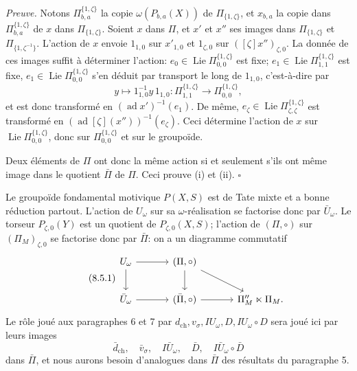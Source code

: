 \documentclass[10pt,a4paper]{article}
\newcommand{\Lie}{\operatorname{Lie}}
\newcommand{\ad}{\operatorname{ad}}
\theoremstyle{deligne}
\newenvironment{proofdel}{\textit{Preuve.}}{\hfill$\square$}
\newcommand{\heading}[1]{\vspace{0.65em}\noindent{\bfseries #1}\quad}
\begin{document}
\begin{proofdel}
Notons \(\Pi^{\{1,\zeta\}}_{b,a}\) la copie \(\omega(P_{b,a}(X))\) de \(\Pi_{\{1,\zeta\}}\), et \(x_{b,a}\) la copie dans \(\Pi^{\{1,\zeta\}}_{b,a}\) de \(x\) dans \(\Pi_{\{1,\zeta\}}\). Soient \(x\) dans \(\Pi\), et \(x'\) et \(x''\) ses images dans \(\Pi_{\{1,\zeta\}}\) et \(\Pi_{\{1,\zeta^{-1}\}}\). L'action de \(x\) envoie \(1_{1,0}\) sur \(x'_{1,0}\) et \(1_{\zeta,0}\) sur \(([\zeta]x'')_{\zeta,0}\). La donnée de ces images suffit à déterminer l'action: \(e_0\in\Lie\Pi^{\{1,\zeta\}}_{0,0}\) est fixe; \(e_1\in\Lie\Pi^{\{1,\zeta\}}_{1,1}\) est fixe, \(e_1\in\Lie\Pi^{\{1,\zeta\}}_{0,0}\) s'en déduit par transport le long de \(1_{1,0}\), c'est-à-dire par
\[
y\longmapsto 1_{1,0}^{-1}y\,1_{1,0}:\Pi^{\{1,\zeta\}}_{1,1}\longrightarrow\Pi^{\{1,\zeta\}}_{0,0},
\]
et est donc transformé en \((\ad x')^{-1}(e_1)\). De même, \(e_\zeta\in\Lie\Pi^{\{1,\zeta\}}_{\zeta,\zeta}\) est transformé en \((\ad[\zeta](x''))^{-1}(e_\zeta)\). Ceci détermine l'action de \(x\) sur \(\Lie\Pi^{\{1,\zeta\}}_{0,0}\), donc sur \(\Pi^{\{1,\zeta\}}_{0,0}\) et sur le groupoïde.

Deux éléments de \(\Pi\) ont donc la même action si et seulement s'ils ont même image dans le quotient \(\bar\Pi\) de \(\Pi\). Ceci prouve (i) et (ii).
\end{proofdel}

\heading{8.5.} Le groupoïde fondamental motivique \(P(X,S)\) est de Tate mixte et a bonne réduction partout. L'action de \(U_\omega\) sur sa \(\omega\)-réalisation se factorise donc par \(\bar U_\omega\). Le torseur \(P_{\zeta,0}(Y)\) est un quotient de \(P_{\zeta,0}(X,S)\); l'action de \((\Pi,\circ)\) sur \((\Pi_M)_{\zeta,0}\) se factorise donc par \(\bar\Pi\): on a un diagramme commutatif
\[
\tag{8.5.1}
\begin{tikzcd}[column sep=3.4em,row sep=2.1em]
U_\omega \arrow[r] \arrow[d] & (\Pi,\circ) \arrow[d] \arrow[dr] & \\
\bar U_\omega \arrow[r] & (\bar\Pi,\circ) \arrow[r] & \Pi_M^{\prime\prime}\ltimes\Pi_M .
\end{tikzcd}
\]
Le rôle joué aux paragraphes 6 et 7 par \(d_{\mathrm{ch}},v_\sigma,IU_\omega,D,IU_\omega\circ D\) sera joué ici par leurs images
\[
\bar d_{\mathrm{ch}},\quad \bar v_\sigma,\quad I\bar U_\omega,\quad \bar D,\quad I\bar U_\omega\circ\bar D
\]
dans \(\bar\Pi\), et nous aurons besoin d'analogues dans \(\bar\Pi\) des résultats du paragraphe 5.
\end{document}
